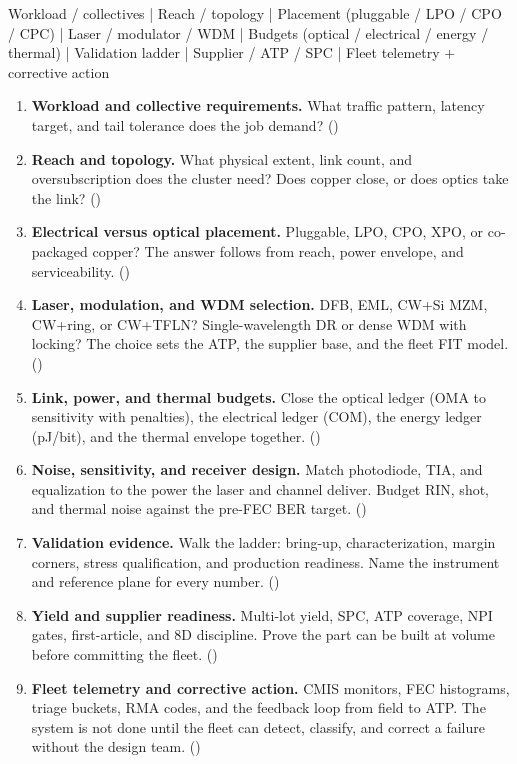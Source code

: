 \begin{dectree}
Workload / collectives
  |
Reach / topology
  |
Placement (pluggable / LPO / CPO / CPC)
  |
Laser / modulator / WDM
  |
Budgets (optical / electrical / energy / thermal)
  |
Validation ladder
  |
Supplier / ATP / SPC
  |
Fleet telemetry + corrective action
\end{dectree}

\begin{enumerate}
\item \textbf{Workload and collective requirements.} What traffic pattern, latency
      target, and tail tolerance does the job demand?
      ()
\item \textbf{Reach and topology.} What physical extent, link count, and
      oversubscription does the cluster need? Does copper close, or does optics
      take the link? ()
\item \textbf{Electrical versus optical placement.} Pluggable, LPO, CPO, XPO, or
      co-packaged copper? The answer follows from reach, power envelope, and
      serviceability. ()
\item \textbf{Laser, modulation, and WDM selection.} DFB, EML, CW+Si MZM, CW+ring,
      or CW+TFLN? Single-wavelength DR or dense WDM with locking? The choice sets
      the ATP, the supplier base, and the fleet FIT model.
      ()
\item \textbf{Link, power, and thermal budgets.} Close the optical ledger (OMA to
      sensitivity with penalties), the electrical ledger (COM), the energy ledger
      (pJ/bit), and the thermal envelope together.
      ()
\item \textbf{Noise, sensitivity, and receiver design.} Match photodiode, TIA, and
      equalization to the power the laser and channel deliver. Budget RIN, shot,
      and thermal noise against the pre-FEC BER target.
      ()
\item \textbf{Validation evidence.} Walk the ladder: bring-up, characterization,
      margin corners, stress qualification, and production readiness. Name the
      instrument and reference plane for every number.
      ()
\item \textbf{Yield and supplier readiness.} Multi-lot yield, SPC, ATP coverage,
      NPI gates, first-article, and 8D discipline. Prove the part can be built at
      volume before committing the fleet.
      ()
\item \textbf{Fleet telemetry and corrective action.} CMIS monitors, FEC
      histograms, triage buckets, RMA codes, and the feedback loop from field to
      ATP. The system is not done until the fleet can detect, classify, and correct
      a failure without the design team.
      ()
\end{enumerate}


